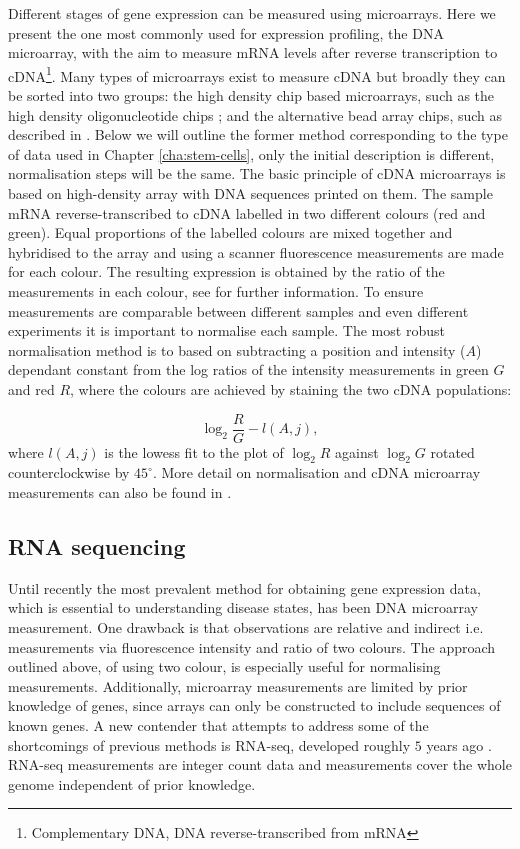 Different stages of gene expression can be measured using microarrays. Here we present the one most commonly used for expression profiling, the DNA microarray, with the aim  to measure mRNA levels after reverse transcription to cDNA\footnote{Complementary DNA, DNA reverse-transcribed from mRNA}. Many types of microarrays exist to measure cDNA but broadly they can be sorted into two groups: the high density chip based microarrays, such as the high density oligonucleotide chips \citep{Lockhart:1996jw}; and the alternative bead array chips, such as described in \citep{Kuhn:2004gf}. Below we will outline the former method corresponding to the type of data used in Chapter \ref{cha:stem-cells}, only the initial description is different, normalisation steps will be the same. The basic principle of cDNA microarrays is based on high-density array with DNA sequences printed on them. The sample mRNA reverse-transcribed to cDNA labelled in two different colours (red and green). Equal proportions of the labelled colours are mixed together and hybridised to the array and using a scanner fluorescence measurements are made for each colour. The resulting expression is obtained by the ratio of the measurements in each colour, see \cite{phimister1999chipping} for further information. To ensure measurements are comparable between different samples and even different experiments it is important to normalise each sample. The most robust normalisation method is to based on subtracting a position and intensity ($A$) dependant constant from the log ratios of the intensity measurements in green $G$ and red $R$, where the colours are achieved by staining the two cDNA populations:

\begin{equation}
  \label{eq:microarray-norm}
  \log_2 \frac{R}{G} - l(A, j),
\end{equation}
where $l(A, j)$ is the lowess fit \citep{Cleveland:2012fu} to the plot of $\log_2 R$ against $\log_2 G$ rotated counterclockwise by $45^{\circ}$. More detail on normalisation and cDNA microarray measurements can also be found in \cite{Dudoit:2002va}.

\subsection{RNA sequencing}
\label{sec:rna-sequencing}

Until recently the most prevalent method for obtaining gene expression data, which is essential to understanding disease states, has been DNA microarray measurement. One drawback is that observations are relative and indirect i.e. measurements via fluorescence intensity and ratio of two colours. The approach outlined above, of using two colour, is especially useful for normalising measurements. Additionally, microarray measurements are limited by prior knowledge of genes, since arrays can only be constructed to include sequences of known genes. A new contender that attempts to address some of the shortcomings of previous methods is RNA-seq, developed roughly $5$ years ago \citep{Mortazavi:2008jj, Nagalakshmi:2008cj}. RNA-seq measurements are integer count data and measurements cover the whole genome independent of prior knowledge.

